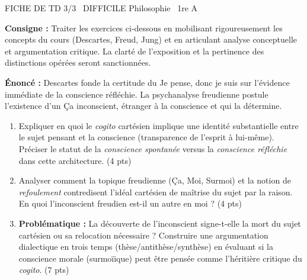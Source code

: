 \documentclass[11pt]{article}
\begin{document}
\begin{tcolorbox}[enhanced,colback=popink,colframe=popink,arc=10pt,boxrule=0pt,left=12pt,right=12pt,top=9pt,bottom=9pt]
{\color{white}\popxbold\small FICHE DE TD 3/3 \textbullet\ DIFFICILE \hfill Philosophie \textbullet\ 1re A\par}
\end{tcolorbox}
\vspace{4pt}
\noindent \textbf{Consigne :} Traiter les exercices ci-dessous en mobilisant rigoureusement les concepts du cours (Descartes, Freud, Jung) et en articulant analyse conceptuelle et argumentation critique. La clarté de l'exposition et la pertinence des distinctions opérées seront sanctionnées.

\begin{exercice}
\textbf{Énoncé :} Descartes fonde la certitude du \og Je pense, donc je suis \fg{} sur l'évidence immédiate de la conscience réfléchie. La psychanalyse freudienne postule l'existence d'un \og Ça \fg{} inconscient, étranger à la conscience et qui la détermine.
\begin{enumerate}
    \item Expliquer en quoi le \textit{cogito} cartésien implique une identité substantielle entre le sujet pensant et la conscience (transparence de l'esprit à lui-même). Préciser le statut de la \textit{conscience spontanée} versus la \textit{conscience réfléchie} dans cette architecture. (4 pts)
    \item Analyser comment la topique freudienne (Ça, Moi, Surmoi) et la notion de \textit{refoulement} contredisent l'idéal cartésien de maîtrise du sujet par la raison. En quoi l'inconscient freudien est-il un \og autre \fg{} en moi ? (4 pts)
    \item \textbf{Problématique :} La découverte de l'inconscient signe-t-elle la \og mort du sujet \fg{} cartésien ou sa \og relocation \fg{} nécessaire ? Construire une argumentation dialectique en trois temps (thèse/antithèse/synthèse) en évaluant si la conscience morale (surmoïique) peut être pensée comme l'héritière critique du \textit{cogito}. (7 pts)
\end{enumerate}
\end{exercice}
\end{document}
